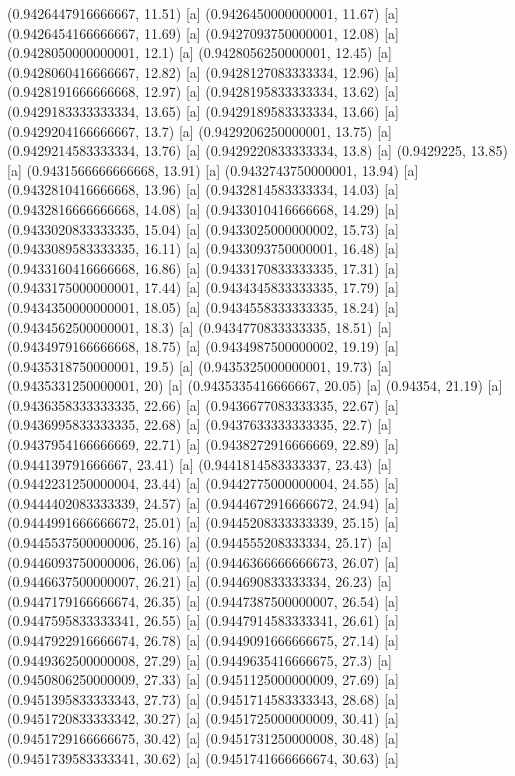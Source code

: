 {{{(0.9426447916666667, 11.51) [a] 
(0.9426450000000001, 11.67) [a] 
(0.9426454166666667, 11.69) [a] 
(0.9427093750000001, 12.08) [a] 
(0.9428050000000001, 12.1) [a] 
(0.9428056250000001, 12.45) [a] 
(0.9428060416666667, 12.82) [a] 
(0.9428127083333334, 12.96) [a] 
(0.9428191666666668, 12.97) [a] 
(0.9428195833333334, 13.62) [a] 
(0.9429183333333334, 13.65) [a] 
(0.9429189583333334, 13.66) [a] 
(0.9429204166666667, 13.7) [a] 
(0.9429206250000001, 13.75) [a] 
(0.9429214583333334, 13.76) [a] 
(0.9429220833333334, 13.8) [a] 
(0.9429225, 13.85) [a] 
(0.9431566666666668, 13.91) [a] 
(0.9432743750000001, 13.94) [a] 
(0.9432810416666668, 13.96) [a] 
(0.9432814583333334, 14.03) [a] 
(0.9432816666666668, 14.08) [a] 
(0.9433010416666668, 14.29) [a] 
(0.9433020833333335, 15.04) [a] 
(0.9433025000000002, 15.73) [a] 
(0.9433089583333335, 16.11) [a] 
(0.9433093750000001, 16.48) [a] 
(0.9433160416666668, 16.86) [a] 
(0.9433170833333335, 17.31) [a] 
(0.9433175000000001, 17.44) [a] 
(0.9434345833333335, 17.79) [a] 
(0.9434350000000001, 18.05) [a] 
(0.9434558333333335, 18.24) [a] 
(0.9434562500000001, 18.3) [a] 
(0.9434770833333335, 18.51) [a] 
(0.9434979166666668, 18.75) [a] 
(0.9434987500000002, 19.19) [a] 
(0.9435318750000001, 19.5) [a] 
(0.9435325000000001, 19.73) [a] 
(0.9435331250000001, 20) [a] 
(0.9435335416666667, 20.05) [a] 
(0.94354, 21.19) [a] 
(0.9436358333333335, 22.66) [a] 
(0.9436677083333335, 22.67) [a] 
(0.9436995833333335, 22.68) [a] 
(0.9437633333333335, 22.7) [a] 
(0.9437954166666669, 22.71) [a] 
(0.9438272916666669, 22.89) [a] 
(0.944139791666667, 23.41) [a] 
(0.9441814583333337, 23.43) [a] 
(0.9442231250000004, 23.44) [a] 
(0.9442775000000004, 24.55) [a] 
(0.9444402083333339, 24.57) [a] 
(0.9444672916666672, 24.94) [a] 
(0.9444991666666672, 25.01) [a] 
(0.9445208333333339, 25.15) [a] 
(0.9445537500000006, 25.16) [a] 
(0.944555208333334, 25.17) [a] 
(0.9446093750000006, 26.06) [a] 
(0.9446366666666673, 26.07) [a] 
(0.9446637500000007, 26.21) [a] 
(0.944690833333334, 26.23) [a] 
(0.9447179166666674, 26.35) [a] 
(0.9447387500000007, 26.54) [a] 
(0.9447595833333341, 26.55) [a] 
(0.9447914583333341, 26.61) [a] 
(0.9447922916666674, 26.78) [a] 
(0.9449091666666675, 27.14) [a] 
(0.9449362500000008, 27.29) [a] 
(0.9449635416666675, 27.3) [a] 
(0.9450806250000009, 27.33) [a] 
(0.9451125000000009, 27.69) [a] 
(0.9451395833333343, 27.73) [a] 
(0.9451714583333343, 28.68) [a] 
(0.9451720833333342, 30.27) [a] 
(0.9451725000000009, 30.41) [a] 
(0.9451729166666675, 30.42) [a] 
(0.9451731250000008, 30.48) [a] 
(0.9451739583333341, 30.62) [a] 
(0.9451741666666674, 30.63) [a] 
}}}
